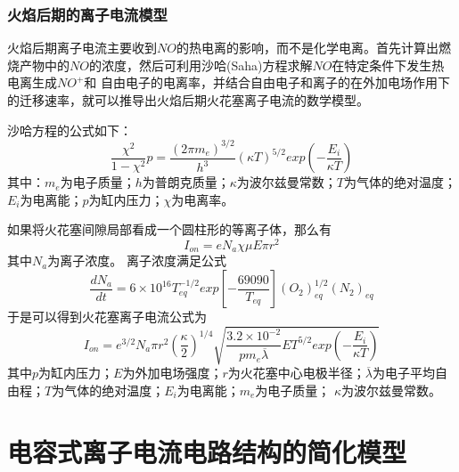 \subsubsection*{火焰后期的离子电流模型}
火焰后期离子电流主要收到$NO$的热电离的影响，而不是化学电离。首先计算出燃烧产物中的$NO$的浓度，然后可利用沙哈(Saha)方程求解$NO$在特定条件下发生热电离生成$NO^{+}$和
自由电子的电离率，并结合自由电子和离子的在外加电场作用下的迁移速率，就可以推导出火焰后期火花塞离子电流的数学模型。\par 
沙哈方程的公式如下：
	\begin{equation}
		\frac{\chi^{2}}{1-\chi^{2}}p=\frac{(2\pi m_{e})^{3/2}}{h^{3}}(\kappa T)^{5/2}exp(-\frac{E_{i}}{\kappa T})
	\end{equation}
其中：$m_{e}$为电子质量；$h$为普朗克质量；$\kappa$为波尔兹曼常数；$T$为气体的绝对温度；$E_{i}$为电离能；$p$为缸内压力；$\chi$为电离率。\par 
如果将火花塞间隙局部看成一个圆柱形的等离子体，那么有
\begin{equation}
	I_{on}=eN_{a}\chi \mu E\pi r^{2}
\end{equation}
其中$N_{a}$为离子浓度。
离子浓度满足公式
\begin{equation}
	\frac{dN_{a}}{dt}=6\times10^{16}T_{eq}^{-1/2}exp[-\frac{69090}{T_{eq}}](O_{2})_{eq}^{1/2}(N_{2})_{eq}
\end{equation}
于是可以得到火花塞离子电流公式为
\begin{equation}
	I_{on}=e^{3/2}N_{a}\pi r^{2}(\frac{\kappa}{2})^{1/4}\sqrt{\frac{3.2\times10^{-2}}{pm_{e}\overline{\lambda}}ET^{5/2}exp(-\frac{E_{i}}{\kappa T})}
\end{equation}
其中$p$为缸内压力；$E$为外加电场强度；$r$为火花塞中心电极半径；$\overline{\lambda}$为电子平均自由程；$T$为气体的绝对温度；$E_{i}$为电离能；$m_{e}$为电子质量；
$\kappa$为波尔兹曼常数。
\section{电容式离子电流电路结构的简化模型}
